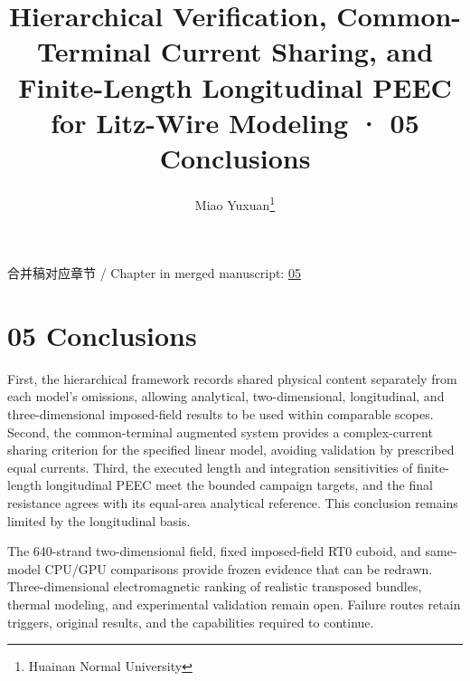 \documentclass[journal,10pt]{IEEEtran}
\begin{document}
\title{Hierarchical Verification, Common-Terminal Current Sharing, and Finite-Length Longitudinal PEEC for Litz-Wire Modeling · 05 Conclusions}
\author{Miao Yuxuan\thanks{Huainan Normal University}}

\maketitle
\noindent 合并稿对应章节 / Chapter in merged manuscript: \href{paper_en_ieee.pdf#chapter-05}{05}\par
\FloatBarrier
\section*{05 Conclusions}
\hypertarget{chapter-05}{}
First, the hierarchical framework records shared physical content separately from each model’s omissions, allowing analytical, two-dimensional, longitudinal, and three-dimensional imposed-field results to be used within comparable scopes. Second, the common-terminal augmented system provides a complex-current sharing criterion for the specified linear model, avoiding validation by prescribed equal currents. Third, the executed length and integration sensitivities of finite-length longitudinal PEEC meet the bounded campaign targets, and the final resistance agrees with its equal-area analytical reference. This conclusion remains limited by the longitudinal basis.


The 640-strand two-dimensional field, fixed imposed-field RT0 cuboid, and same-model CPU/GPU comparisons provide frozen evidence that can be redrawn. Three-dimensional electromagnetic ranking of realistic transposed bundles, thermal modeling, and experimental validation remain open. Failure routes retain triggers, original results, and the capabilities required to continue.
\end{document}
